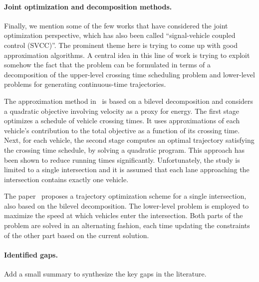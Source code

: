 \documentclass[a4paper]{report}
\theoremstyle{definition}
\theoremstyle{plain}
\newcommand\note[1]{{\color{Navy}\noindent#1}}
\begin{document}
\paragraph{Joint optimization and decomposition methods.}

Finally, we mention some of the few works that have considered the joint
optimization perspective, which has also been called ``signal-vehicle coupled
control (SVCC)''. The prominent theme here is trying to come up with good
approximation algorithms. A central idea in this line of work is trying to
exploit somehow the fact that the problem can be formulated in terms of a
decomposition of the upper-level crossing time scheduling problem and
lower-level problems for generating continuous-time trajectories.

The approximation method in~\cite{hultApproximateSolutionOptimal2015} is based
on a bilevel decomposition and considers a quadratic objective involving
velocity as a proxy for energy. The first stage optimizes a schedule of vehicle
crossing times. It uses approximations of each vehicle's contribution to the
total objective as a function of its crossing time. Next, for each vehicle, the
second stage computes an optimal trajectory satisfying the crossing time
schedule, by solving a quadratic program. This approach has been shown to reduce
running times significantly. Unfortunately, the study is limited to a single
intersection and it is assumed that each lane approaching the intersection
contains exactly one vehicle.

The paper~\cite{zhaoBilevelProgrammingModel2021} proposes a trajectory
optimization scheme for a single intersection, also based on the bilevel
decomposition. The lower-level problem is employed to maximize the speed at
which vehicles enter the intersection. Both parts of the problem are solved in an alternating
fashion, each time updating the constraints of the other part based on the
current solution.

\note{\paragraph{Identified gaps.} Add a small summary to synthesize the key gaps in the literature.}

\end{document}
